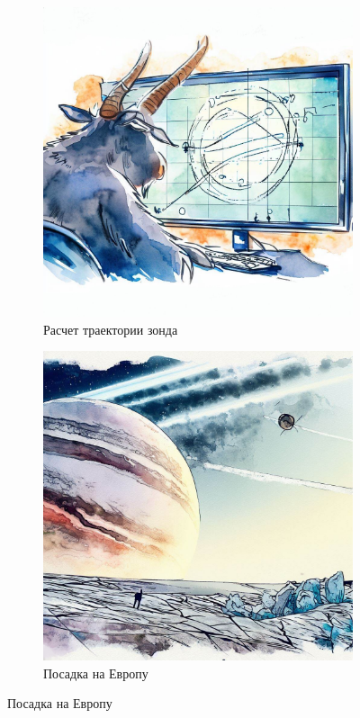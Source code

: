\documentclass[a5paper,11pt]{memoir}
\begin{document}
\newpage
\begin{figure}[h]
  \begin{subfigure}{.5\textwidth}
    \centering
    \includegraphics[width=.8\linewidth]{images/gnu-screen.jpg}
    \caption{Расчет траектории зонда}
  \end{subfigure}%
  \begin{subfigure}{.5\textwidth}
    \centering
    \includegraphics[width=.8\linewidth]{images/europa.jpg}
    \caption{Посадка на Европу}
  \end{subfigure}


\end{figure}
\end{document}
